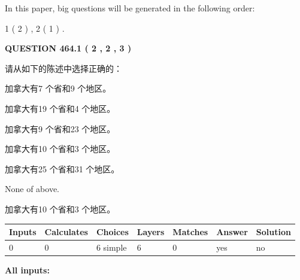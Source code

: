 \documentclass{ctexart}
\begin{document}
   
   
\vspace{0.2in}
   
In this paper, big questions will be generated in the following order: 
   
   
   1 ( 2 )
 ,
   2 ( 1 )
 .
  
\vspace{0.2in}
  
{\textbf{\Large{QUESTION
464.1 
 ( 2 , 2 , 3 )
}}}
  
  
请从如下的陈述中选择正确的：
 
 
加拿大有7 个省和9 个地区。
 
 
加拿大有19 个省和4 个地区。
 
 
加拿大有9 个省和23 个地区。
 
 
加拿大有10 个省和3 个地区。
 
 
加拿大有25 个省和31 个地区。
 
 
 None of above.
 
 
\noindent{}
 
 
加拿大有10 个省和3 个地区。
 
 
\noindent{}
 
 
   
   
   
   
\noindent\begin{tabular}{|l|l|l|l|l|l|l|}
 \hline
Inputs & Calculates & Choices & Layers & Matches & Answer & Solution \\ \hline
 0  & 
 0  & 
 6
  simple  
  & 
 6  & 
 0  & 
  yes & 
  no 
  \\ \hline
 \end{tabular}
   
   
   
   
\noindent{}
   
   
   
   
\noindent\vspace{0.1in}\hspace{-0.08in} {\textbf{\Large{All inputs: }}}
   
\end{document}
